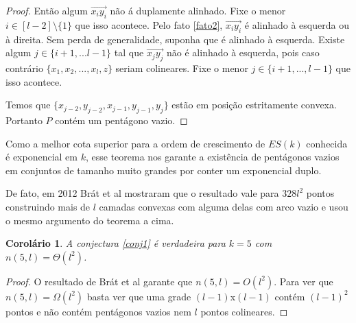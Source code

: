 \documentclass[a4paper]{book}
\newtheorem{corolario}{Corolário}[teorema]
\begin{document}
\begin{proof}
    Então algum $\overrightarrow{x_iy_i}$ não á duplamente alinhado. Fixe o menor $i\in[l-2]\setminus\{1\}$ que isso acontece. Pelo fato \ref{fato2}, $\overrightarrow{x_iy_i}$ é alinhado à esquerda ou à direita. Sem perda de generalidade, suponha que é alinhado à esquerda. Existe algum $j\in\{i+1,...l-1\}$ tal que $\overrightarrow{x_jy_j}$ não é alinhado à esquerda, pois caso contrário $\{x_1,x_2,...,x_l,z\}$ seriam colineares. Fixe o menor $j\in\{i+1,...,l-1\}$ que isso acontece.

    Temos que $\{x_{j-2},y_{j-2},x_{j-1},y_{j-1},y_j\}$ estão em posição estritamente convexa. Portanto $P$ contém um pentágono vazio.

\end{proof}

Como a melhor cota superior para a ordem de crescimento de $ES(k)$ conhecida é exponencial em $k$\cite{ESbound}, esse teorema nos garante a existência de pentágonos vazios em conjuntos de tamanho muito grandes por conter um exponencial duplo. 

De fato, em 2012 Brát et al\cite{pentagon2} mostraram que o resultado vale para $328l^2$ pontos construindo mais de $l$ camadas convexas com alguma delas com arco vazio e usou o mesmo argumento do teorema a cima.

\begin{corolario}
    A conjectura \ref{conj1} é verdadeira para $k=5$ com $n(5,l)=\Theta(l^2)$.
\end{corolario}
\begin{proof}
    O resultado de Brát et al\cite{pentagon2} garante que $n(5,l)=O(l^2)$. Para ver que $n(5,l)=\Omega(l^2)$ basta ver que uma grade $(l-1)$x$(l-1)$ contém $(l-1)^2$ pontos e não contém pentágonos vazios nem $l$ pontos colineares.
\end{proof}
\end{document}

